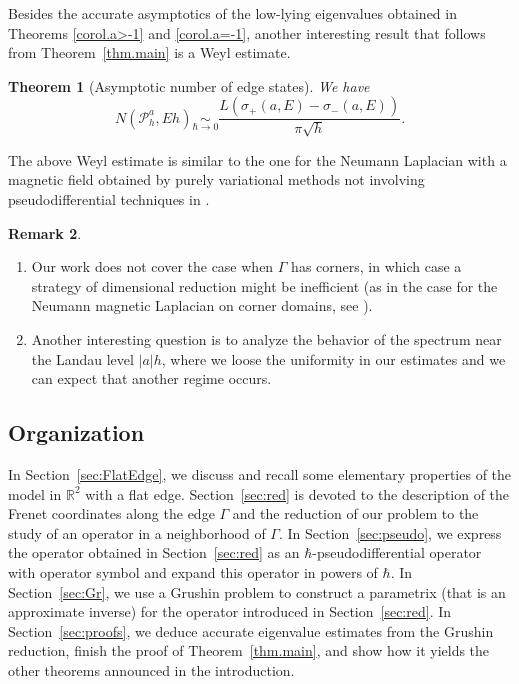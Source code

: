 \documentclass[10pt]{amsart}
\newcommand{\cP}{\mathcal{P}}
\theoremstyle{plain}
\newtheorem{theorem}{Theorem}[section]
\theoremstyle{definition}
\newtheorem{remark}[theorem]{Remark}
\newcommand{\R}{\mathbb{R}}
\providecommand{\skpt}{\par\smallskip\noindent}
\begin{document}
Besides the accurate asymptotics of the low-lying eigenvalues obtained in Theorems \ref{corol.a>-1} and \ref{corol.a=-1}, another interesting result that follows from Theorem~\ref{thm.main} is a Weyl estimate.

\begin{theorem}[Asymptotic number of edge states]\label{corol.weyl}
We have
\[
N(\cP^a_h, Eh)\underset{\hbar\to 0}\sim \frac{L(\sigma_+(a,E)-\sigma_-(a,E))}{\pi\sqrt{h}}.
\]
\end{theorem}

The above Weyl estimate is similar to the one for the Neumann Laplacian with a magnetic field obtained by purely variational methods
not involving pseudodifferential techniques in \cite{F07, FK, KK}.

\enlargethispage{-\baselineskip}
\pagebreak[2]
\skpt
\begin{remark}
\begin{enumerate}
\item Our work does not cover the case when $\Gamma$ has corners, in which case a strategy of dimensional reduction might be inefficient (as in the case for the Neumann magnetic Laplacian on corner domains, see \cite{BN, BND06}).
\item Another interesting question is to analyze the behavior of the spectrum near the Landau level $|a|h$, where we loose the uniformity in our estimates and we can expect that another regime occurs.
\end{enumerate}
\end{remark}

\subsection{Organization}

In Section~\ref{sec:FlatEdge}, we discuss and recall some elementary properties of the model in $\R^2$ with a flat edge.
Section~\ref{sec:red} is devoted to the description of the Frenet coordinates along the edge $\Gamma$ and the reduction of our problem to the study of an operator in a neighborhood of $\Gamma$.
In Section~\ref{sec:pseudo}, we express the operator obtained in Section~\ref{sec:red} as an $\hbar$-pseudodifferential operator with operator symbol and expand this operator in powers of $\hbar$. In Section~\ref{sec:Gr}, we use a Grushin problem to construct a parametrix (that is an approximate inverse) for the operator introduced in Section~\ref{sec:red}.
In Section~\ref{sec:proofs}, we deduce accurate eigenvalue estimates from the Grushin reduction, finish the proof of Theorem~\ref{thm.main}, and show how it yields the other theorems announced in the introduction.
\end{document}
